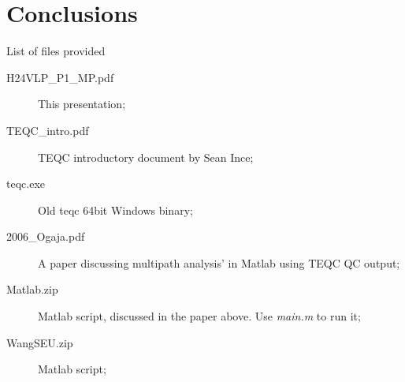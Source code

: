 \documentclass[11pt]{beamer}
\begin{document}
	\section{Conclusions}
	
	\begin{frame}{List of files provided}
			\begin{description}
			\item[H24VLP\_P1\_MP.pdf] This presentation;
			\item[TEQC\_intro.pdf] TEQC introductory document by Sean Ince;
			\item[teqc.exe] Old teqc 64bit Windows binary;
			\item[2006\_Ogaja.pdf] A paper discussing multipath analysis' in Matlab using TEQC QC output;
			\item[Matlab.zip] Matlab script, discussed in the paper above. Use \textit{main.m} to run it;
			\item[WangSEU.zip] Matlab script;
		\end{description}
	\end{frame}
\end{document}
